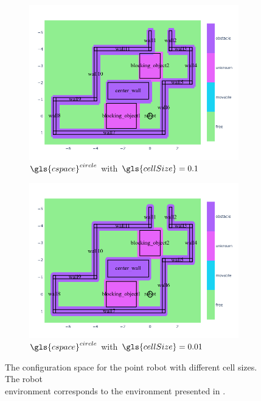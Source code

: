 \begin{figure}[H]
  \centering
  \begin{subfigure}{.49\textwidth}
    \centering
    \includegraphics[width=1.10\textwidth]{figures/planning/c_space_point_robot_grid_size_0_1}
    \caption{$\gls{cspace}^{circle}$ with $\gls{cellSize} = 0.1$}%
    \label{fig:c_space_two_pushes_small}
  \end{subfigure}
  \begin{subfigure}{.49\textwidth}
    \centering
    \includegraphics[width=1.10\textwidth]{figures/planning/c_space_point_robot_grid_size_0_01}
    \caption{$\gls{cspace}^{circle}$ with $\gls{cellSize} = 0.01$}%
    \label{fig:c_space_two_pushes_smaller}
  \end{subfigure}
  \caption{The configuration space for the point robot with different cell sizes. The robot\\environment corresponds to the environment presented in .}
  \label{fig:two_pushes_to_freedom_conf_space}
\end{figure}

